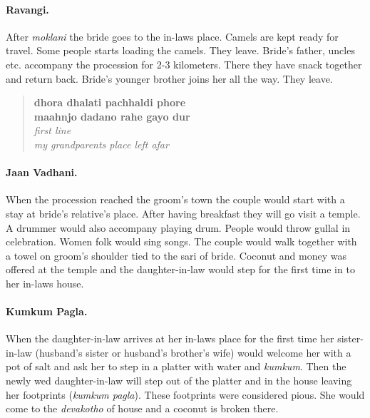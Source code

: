 \paragraph{Ravangi.} After \textit{moklani} the bride goes to the in-laws place. Camels are kept ready for travel. Some people starts loading the camels. They leave. Bride's father, uncles etc. accompany the procession for 2-3 kilometers. There they have snack together and return back. Bride's younger brother joins her all the way. They leave.

\begin{quote}
\textbf{
dhora dhalati pachhaldi phore\\
maahnjo dadano rahe gayo dur
}\\
\textit{
first line\\
my grandparents place left afar
}
\end{quote}

\paragraph{Jaan Vadhani.} When the procession reached the groom's town the
couple would start with a stay at bride's relative's place. After having
breakfast they will go visit a temple. A drummer would also accompany playing
drum. People would throw gullal in celebration. Women folk would sing songs.
The couple would walk together with a towel on groom's shoulder tied to the
sari of bride. Coconut and money was offered at the temple and the
daughter-in-law would step for the first time in to her in-laws house.

\paragraph{Kumkum Pagla.} When the daughter-in-law arrives at her in-laws place
for the first time her sister-in-law (husband's sister or husband's brother's
wife) would welcome her with a pot of salt and ask her to step in a
platter with water and \textit{kumkum}. Then the newly wed daughter-in-law will step out
of the platter and in the house leaving her footprints (\textit{kumkum pagla}).
These footprints were considered pious. She would come to the
\textit{devakotho} of house and a coconut is broken there.

